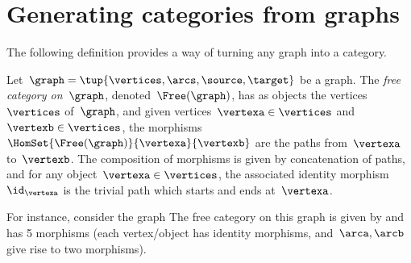 
\section[Categories from graphs]{Generating categories from graphs}
\label{sec:catsfromgraphs}

The following definition provides a way of turning any graph into a category.

\begin{ctdefinition}
    \label{def:free-category}
    Let~$\graph=\tup{\vertices,\arcs,\source,\target}$ be a graph.
    The \emph{free category on~$\graph$}, denoted~$\Free(\graph)$, has as objects the vertices~$\vertices$ of~$\graph$, and given vertices~$\vertexa\in \vertices$ and~$\vertexb\in \vertices$, the morphisms~$\HomSet{\Free(\graph)}{\vertexa}{\vertexb}$ are the paths from~$\vertexa$ to~$\vertexb$.
    The composition of morphisms is given by concatenation of paths, and for any object~$\vertexa \in \vertices$, the associated identity morphism~$\id_\vertexa$ is the trivial path which starts and ends at~$\vertexa$.
\end{ctdefinition}

For instance, consider the graph
The free category on this graph is given by
and has 5 morphisms (each vertex/object has identity morphisms, and~$\arca,\arcb$ give rise to two morphisms).

